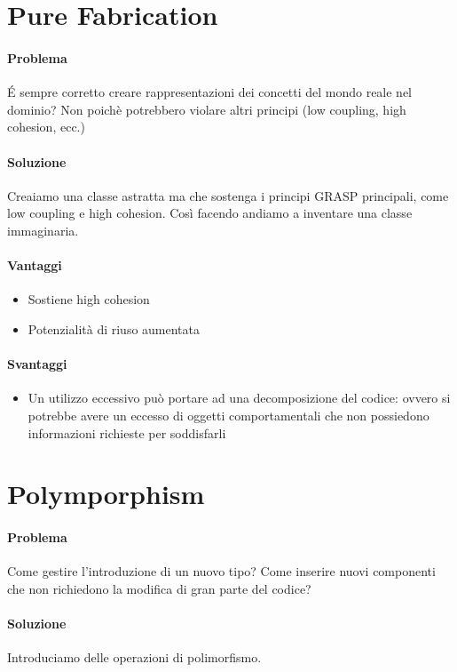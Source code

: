 \section{Pure Fabrication}
\paragraph*{Problema} \'E sempre corretto creare rappresentazioni dei concetti del mondo
reale nel dominio? Non poichè potrebbero violare altri principi (low coupling, high cohesion, ecc.)
\paragraph*{Soluzione} Creaiamo una classe astratta ma che sostenga i principi GRASP principali,
come low coupling e high cohesion. Così facendo andiamo a inventare una classe immaginaria.
\paragraph*{Vantaggi}
\begin{itemize}
    \item Sostiene high cohesion
    \item Potenzialità di riuso aumentata
\end{itemize}
\paragraph*{Svantaggi}
\begin{itemize}
    \item Un utilizzo eccessivo può portare ad una decomposizione del codice: ovvero si
    potrebbe avere un eccesso di oggetti comportamentali che non possiedono informazioni richieste
    per soddisfarli
\end{itemize}
\section{Polymporphism}
\paragraph*{Problema} Come gestire l'introduzione di un nuovo tipo? Come inserire nuovi componenti
che non richiedono la modifica di gran parte del codice? 
\paragraph*{Soluzione} Introduciamo delle operazioni di polimorfismo.
